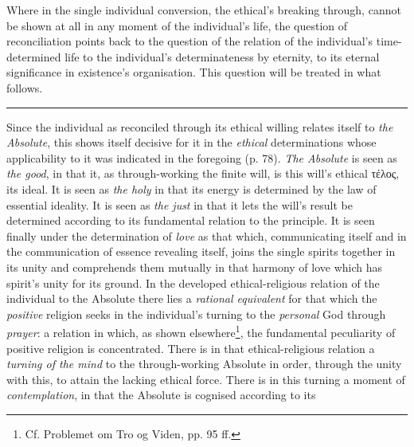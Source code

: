 \documentclass[12pt,a4paper]{book}
\begin{document}
Where in the single individual conversion, the ethical's breaking through,
cannot be shown at all in any moment of the individual's life, the question of
reconciliation points back to the question of the relation of the individual's
time-determined life to the individual's determinateness by eternity, to its
eternal significance in existence's organisation. This question will be treated
in what follows.

\begin{center}\rule{2cm}{0.4pt}\end{center}

Since the individual as reconciled through its ethical willing relates itself to
\emph{the Absolute}, this shows itself decisive for it in the \emph{ethical}
determinations whose applicability to it was indicated in the foregoing (p. 78).
\emph{The Absolute} is seen as \emph{the good}, in that it, as through-working
the finite will, is this will's ethical τέλος, its ideal. It is seen as
\emph{the holy} in that its energy is determined by the law of essential
ideality. It is seen as \emph{the just} in that it lets the will's result be
determined according to its fundamental relation to the principle. It is seen
finally under the determination of \emph{love} as that which, communicating
itself and in the communication of essence revealing itself, joins the single
spirits together in its unity and comprehends them mutually in that harmony of
love which has spirit's unity for its ground.
\setcounter{footnote}{0}
In the developed ethical-religious relation of the individual to the Absolute
there lies a \emph{rational equivalent} for that which the \emph{positive}
religion seeks in the individual's turning to the \emph{personal} God through
\emph{prayer}: a relation in which, as shown elsewhere\footnote{Cf. Problemet om
Tro og Viden, pp. 95 ff.}, the fundamental peculiarity of positive religion is
concentrated. There is in that ethical-religious relation a \emph{turning of the
mind} to the through-working Absolute in order, through the unity with this, to
attain the lacking ethical force. There is in this turning a moment of
\emph{contemplation}, in that the Absolute is cognised according to its
\end{document}
